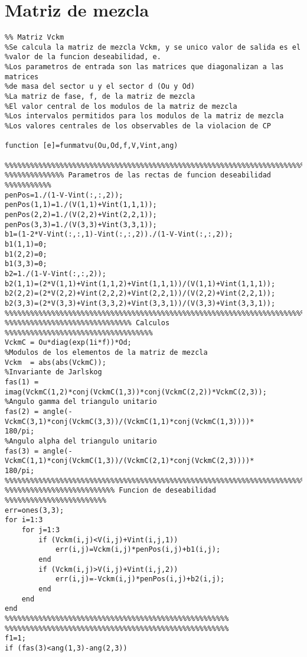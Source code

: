 \section{Matriz de mezcla}
\begin{verbatim}
%% Matriz Vckm
%Se calcula la matriz de mezcla Vckm, y se unico valor de salida es el
%valor de la funcion deseabilidad, e.
%Los parametros de entrada son las matrices que diagonalizan a las matrices
%de masa del sector u y el sector d (Ou y Od)
%La matriz de fase, f, de la matriz de mezcla 
%El valor central de los modulos de la matriz de mezcla
%Los intervalos permitidos para los modulos de la matriz de mezcla
%Los valores centrales de los observables de la violacion de CP

function [e]=funmatvu(Ou,Od,f,V,Vint,ang)

%%%%%%%%%%%%%%%%%%%%%%%%%%%%%%%%%%%%%%%%%%%%%%%%%%%%%%%%%%%%%%%%%%%%%%%%%%%
%%%%%%%%%%%%%% Parametros de las rectas de funcion deseabilidad %%%%%%%%%%%
penPos=1./(1-V-Vint(:,:,2));
penPos(1,1)=1./(V(1,1)+Vint(1,1,1));
penPos(2,2)=1./(V(2,2)+Vint(2,2,1));
penPos(3,3)=1./(V(3,3)+Vint(3,3,1));
b1=(1-2*V-Vint(:,:,1)-Vint(:,:,2))./(1-V-Vint(:,:,2));
b1(1,1)=0;
b1(2,2)=0;
b1(3,3)=0;
b2=1./(1-V-Vint(:,:,2));
b2(1,1)=(2*V(1,1)+Vint(1,1,2)+Vint(1,1,1))/(V(1,1)+Vint(1,1,1));
b2(2,2)=(2*V(2,2)+Vint(2,2,2)+Vint(2,2,1))/(V(2,2)+Vint(2,2,1));
b2(3,3)=(2*V(3,3)+Vint(3,3,2)+Vint(3,3,1))/(V(3,3)+Vint(3,3,1));
%%%%%%%%%%%%%%%%%%%%%%%%%%%%%%%%%%%%%%%%%%%%%%%%%%%%%%%%%%%%%%%%%%%%%%%%%%%
%%%%%%%%%%%%%%%%%%%%%%%%%%%%%% Calculos %%%%%%%%%%%%%%%%%%%%%%%%%%%%%%%%%%%
VckmC = Ou*diag(exp(1i*f))*Od;
%Modulos de los elementos de la matriz de mezcla
Vckm  = abs(abs(VckmC));
%Invariante de Jarlskog
fas(1) = imag(VckmC(1,2)*conj(VckmC(1,3))*conj(VckmC(2,2))*VckmC(2,3));
%Angulo gamma del triangulo unitario
fas(2) = angle(-VckmC(3,1)*conj(VckmC(3,3))/(VckmC(1,1)*conj(VckmC(1,3))))*
180/pi;
%Angulo alpha del triangulo unitario
fas(3) = angle(-VckmC(1,1)*conj(VckmC(1,3))/(VckmC(2,1)*conj(VckmC(2,3))))*
180/pi;
%%%%%%%%%%%%%%%%%%%%%%%%%%%%%%%%%%%%%%%%%%%%%%%%%%%%%%%%%%%%%%%%%%%%%%%%%%%
%%%%%%%%%%%%%%%%%%%%%%%%%% Funcion de deseabilidad %%%%%%%%%%%%%%%%%%%%%%%%
err=ones(3,3);
for i=1:3
    for j=1:3
        if (Vckm(i,j)<V(i,j)+Vint(i,j,1))
            err(i,j)=Vckm(i,j)*penPos(i,j)+b1(i,j);
        end
        if (Vckm(i,j)>V(i,j)+Vint(i,j,2))
            err(i,j)=-Vckm(i,j)*penPos(i,j)+b2(i,j);
        end
    end    
end
%%%%%%%%%%%%%%%%%%%%%%%%%%%%%%%%%%%%%%%%%%%%%%%%%%%%%
%%%%%%%%%%%%%%%%%%%%%%%%%%%%%%%%%%%%%%%%%%%%%%%%%%%%%
f1=1;
if (fas(3)<ang(1,3)-ang(2,3))

\end{verbatim}
